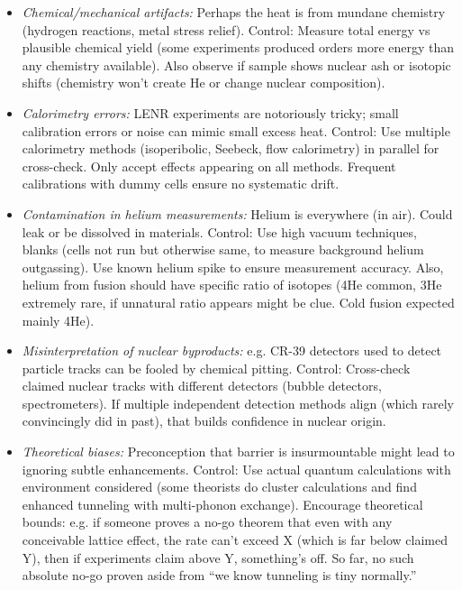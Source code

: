 \documentclass[11pt]{article}
\begin{document}
\begin{itemize}

\item 
\textit{Chemical/mechanical artifacts:} Perhaps the heat is from mundane chemistry (hydrogen reactions, metal stress relief). Control: Measure total energy vs plausible chemical yield (some experiments produced orders more energy than any chemistry available). Also observe if sample shows nuclear ash or isotopic shifts (chemistry won't create He or change nuclear composition).




\item 
\textit{Calorimetry errors:} LENR experiments are notoriously tricky; small calibration errors or noise can mimic small excess heat. Control: Use multiple calorimetry methods (isoperibolic, Seebeck, flow calorimetry) in parallel for cross-check. Only accept effects appearing on all methods. Frequent calibrations with dummy cells ensure no systematic drift.




\item 
\textit{Contamination in helium measurements:} Helium is everywhere (in air). Could leak or be dissolved in materials. Control: Use high vacuum techniques, blanks (cells not run but otherwise same, to measure background helium outgassing). Use known helium spike to ensure measurement accuracy. Also, helium from fusion should have specific ratio of isotopes (4He common, 3He extremely rare, if unnatural ratio appears might be clue. Cold fusion expected mainly 4He).




\item 
\textit{Misinterpretation of nuclear byproducts:} e.g. CR-39 detectors used to detect particle tracks can be fooled by chemical pitting. Control: Cross-check claimed nuclear tracks with different detectors (bubble detectors, spectrometers). If multiple independent detection methods align (which rarely convincingly did in past), that builds confidence in nuclear origin.




\item 
\textit{Theoretical biases:} Preconception that barrier is insurmountable might lead to ignoring subtle enhancements. Control: Use actual quantum calculations with environment considered (some theorists do cluster calculations and find enhanced tunneling with multi-phonon exchange). Encourage theoretical bounds: e.g. if someone proves a no-go theorem that even with any conceivable lattice effect, the rate can’t exceed X (which is far below claimed Y), then if experiments claim above Y, something’s off. So far, no such absolute no-go proven aside from “we know tunneling is tiny normally.”





\end{itemize}
\end{document}
